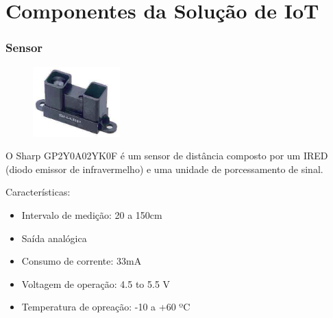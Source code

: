 \documentclass{beamer}
\begin{document}
\section{Componentes da Solução de IoT}

\begin{frame}
\frametitle{Sensor}
\begin{minipage}{\textwidth}
		
		
		
	\begin{figure}
		\vspace{+20pt}
		\begin{center}
			\includegraphics[width=0.3\textwidth]{sharp_sensor.jpg}
		\end{center}
	\end{figure}
	
	O Sharp GP2Y0A02YK0F é um sensor de distância composto por um IRED (diodo emissor de infravermelho) e uma unidade de porcessamento de sinal.

	Características:
	
	\begin{itemize}
		\item Intervalo de medição: 20 a 150cm
		\item Saída analógica
		\item Consumo de corrente: 33mA
		\item Voltagem de operação: 4.5 to 5.5 V
		\item Temperatura de opreação: -10 a +60 ºC
	\end{itemize}
		
\end{minipage}
\end{frame}
\end{document}
